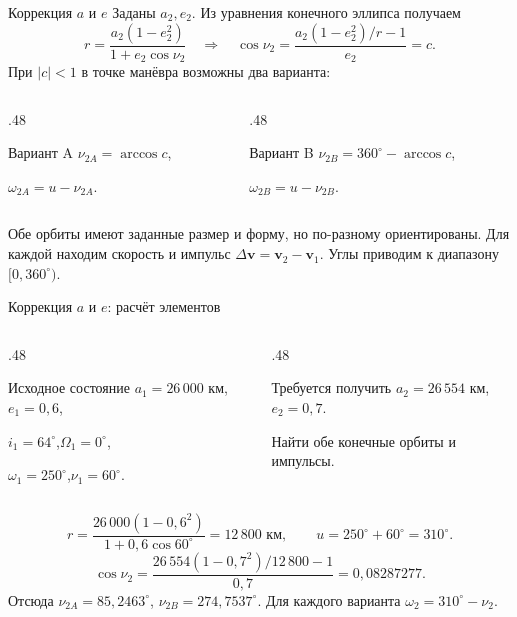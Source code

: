 \documentclass[11pt,aspectratio=169,t]{beamer}
\begin{document}
\begin{frame}{Коррекция $a$ и $e$}
Заданы $a_2,e_2$. Из уравнения конечного эллипса получаем
\[
r=\frac{a_2(1-e_2^2)}{1+e_2\cos\nu_2}
\quad\Longrightarrow\quad
\cos\nu_2=\frac{a_2(1-e_2^2)/r-1}{e_2}=c.
\]
При $|c|<1$ в точке манёвра возможны два варианта:
\begin{columns}[T,onlytextwidth]
\begin{column}{.48\textwidth}
\begin{block}{Вариант A}
$\nu_{2A}=\arccos c$,\par\smallskip
$\omega_{2A}=u-\nu_{2A}$.
\end{block}
\end{column}
\begin{column}{.48\textwidth}
\begin{block}{Вариант B}
$\nu_{2B}=360^\circ-\arccos c$,\par\smallskip
$\omega_{2B}=u-\nu_{2B}$.
\end{block}
\end{column}
\end{columns}
\medskip
\justifying
Обе орбиты имеют заданные размер и форму, но по-разному ориентированы.
Для каждой находим скорость и импульс $\Delta\mathbf v=\mathbf v_2-\mathbf v_1$.
Углы приводим к диапазону $[0,360^\circ)$.
\end{frame}

\begin{frame}{Коррекция $a$ и $e$: расчёт элементов}
\begin{columns}[T,onlytextwidth]
\begin{column}{.48\textwidth}
\begin{block}{Исходное состояние}
$a_1=26\,000$ км,\quad $e_1=0{,}6$,\par
$i_1=64^\circ$,\quad $\Omega_1=0^\circ$,\par
$\omega_1=250^\circ$,\quad $\nu_1=60^\circ$.
\end{block}
\end{column}
\begin{column}{.48\textwidth}
\begin{block}{Требуется получить}
$a_2=26\,554$ км,\quad $e_2=0{,}7$.
\par\medskip
Найти обе конечные орбиты и импульсы.
\end{block}
\end{column}
\end{columns}
\[
r=\frac{26\,000(1-0{,}6^2)}{1+0{,}6\cos60^\circ}=12\,800\text{ км},
\qquad u=250^\circ+60^\circ=310^\circ.
\]
\[
\cos\nu_2=\frac{26\,554(1-0{,}7^2)/12\,800-1}{0{,}7}=0{,}08287277.
\]
Отсюда $\nu_{2A}=85{,}2463^\circ$, $\nu_{2B}=274{,}7537^\circ$.
Для каждого варианта $\omega_2=310^\circ-\nu_2$.
\end{frame}
\end{document}
